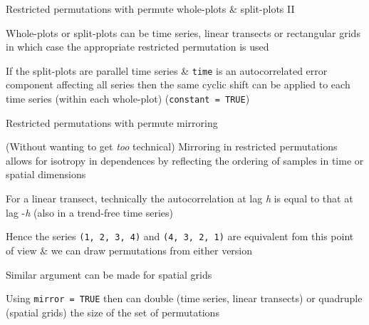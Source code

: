 \documentclass[10pt,ignorenonframetext,compress, aspectratio=169]{beamer}
\begin{document}
\begin{frame}{Restricted permutations with permute \textbar{}
whole-plots \& split-plots II}

Whole-plots or split-plots can be time series, linear transects or
rectangular grids in which case the appropriate restricted permutation
is used

If the split-plots are parallel time series \& \texttt{time} is an
autocorrelated error component affecting all series then the same cyclic
shift can be applied to each time series (within each whole-plot)
(\texttt{constant = TRUE})

\end{frame}

\begin{frame}{Restricted permutations with permute \textbar{} mirroring}

(Without wanting to get \emph{too} technical) Mirroring in restricted
permutations allows for isotropy in dependences by reflecting the
ordering of samples in time or spatial dimensions

For a linear transect, technically the autocorrelation at lag \emph{h}
is equal to that at lag -\emph{h} (also in a trend-free time series)

Hence the series \texttt{(1, 2, 3, 4)} and \texttt{(4, 3, 2, 1)} are
equivalent fom this point of view \& we can draw permutations from
either version

Similar argument can be made for spatial grids

Using \texttt{mirror = TRUE} then can double (time series, linear
transects) or quadruple (spatial grids) the size of the set of
permutations

\end{frame}
\end{document}
